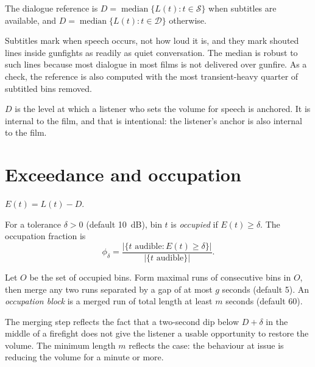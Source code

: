 \begin{definition}
The dialogue reference is $D = \operatorname{median}\{L(t) : t\in\mathcal{S}\}$ when subtitles are available, and $D = \operatorname{median}\{L(t) : t\in\mathcal{D}\}$ otherwise.
\end{definition}

Subtitles mark when speech occurs, not how loud it is, and they mark shouted lines inside gunfights as readily as quiet conversation. The median is robust to such lines because most dialogue in most films is not delivered over gunfire. As a check, the reference is also computed with the most transient-heavy quarter of subtitled bins removed.

$D$ is the level at which a listener who sets the volume for speech is anchored. It is internal to the film, and that is intentional: the listener's anchor is also internal to the film.

\section{Exceedance and occupation}

\begin{definition}[Exceedance]
$E(t) = L(t) - D$.
\end{definition}

\begin{definition}[Occupation]
For a tolerance $\delta > 0$ (default 10~dB), bin $t$ is \emph{occupied} if $E(t) \ge \delta$. The occupation fraction is
\begin{equation}
\phi_\delta = \frac{|\{t \text{ audible} : E(t)\ge\delta\}|}{|\{t \text{ audible}\}|}.
\end{equation}
\end{definition}

\begin{definition}
Let $O$ be the set of occupied bins. Form maximal runs of consecutive bins in $O$, then merge any two runs separated by a gap of at most $g$ seconds (default 5). An \emph{occupation block} is a merged run of total length at least $m$ seconds (default 60).
\end{definition}

The merging step reflects the fact that a two-second dip below $D+\delta$ in the middle of a firefight does not give the listener a usable opportunity to restore the volume. The minimum length $m$ reflects the case: the behaviour at issue is reducing the volume for a minute or more.

